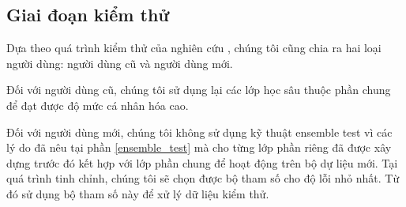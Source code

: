 \subsection{Giai đoạn kiểm thử}

Dựa theo quá trình kiểm thử của nghiên cứu \cite{liang2020think}, chúng tôi cũng chia ra hai loại người dùng: người dùng cũ và người dùng mới.

Đối với người dùng cũ, chúng tôi sử dụng lại các lớp học sâu thuộc phần chung để đạt được độ mức cá nhân hóa cao.

Đối với người dùng mới, chúng tôi không sử dụng kỹ thuật ensemble test vì các lý do đã nêu tại phần \ref{ensemble_test} mà cho từng lớp phần riêng đã được xây dựng trước đó kết hợp với lớp phần chung để hoạt động trên bộ dự liệu mới. Tại quá trình tinh chỉnh, chúng tôi sẽ chọn được bộ tham số cho độ lỗi nhỏ nhất. Từ đó sử dụng bộ tham số này để xử lý dữ liệu kiểm thử.
